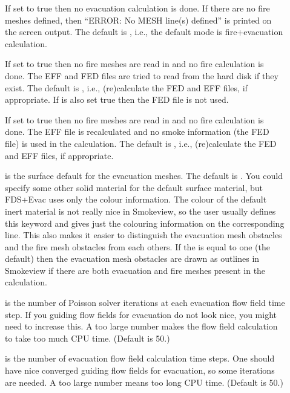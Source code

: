\documentclass[12pt,a4paper,final,twoside]{stylevk}
\begin{document}
\begin{description}
%
\item[] If set to true then no evacuation
  calculation is done.  If there are no fire meshes defined, then
  ``ERROR: No MESH line(s) defined'' is printed on the screen output.
  The default is , i.e., the default mode is
  fire+evacuation calculation.
%
\item[] If set to true then no fire meshes
  are read in and no fire calculation is done.  The EFF and FED files
  are tried to read from the hard disk if they exist.  The default is
  , i.e., (re)calculate the FED and EFF files,
  if appropriate.  If  is also set true then
  the FED file is not used.
%
\item[] If set to true then no fire meshes
  are read in and no fire calculation is done.  The EFF file is
  recalculated and no smoke information (the FED file) is used in the
  calculation.  The default is , i.e.,
  (re)calculate the FED and EFF files, if appropriate.
%
\item[] is the surface default for the
  evacuation meshes.  The default is .  You could specify
  some other solid material for the default surface material, but
  FDS+Evac uses only the colour information.  The colour of the
  default inert material is not really nice in Smokeview, so the user
  usually defines this keyword and gives just the colouring
  information on the corresponding  line.  This also makes
  it easier to distinguish the evacuation mesh obstacles and the fire
  mesh obstacles from each others.  If the  is
  equal to one (the default) then the evacuation mesh obstacles are
  drawn as outlines in Smokeview if there are both evacuation and fire
  meshes present in the calculation.
%
\item[] is the number of Poisson
  solver iterations at each evacuation flow field time step.  If you
  guiding flow fields for evacuation do not look nice, you might need
  to increase this.  A too large number makes the flow field
  calculation to take too much CPU time.  (Default is 50.)
%
\item[] is the number of evacuation flow
  field calculation time steps.  One should have nice converged
  guiding flow fields for evacuation, so some iterations are needed.
  A too large number means too long CPU time.  (Default is 50.)
%
\end{description}
\end{document}
